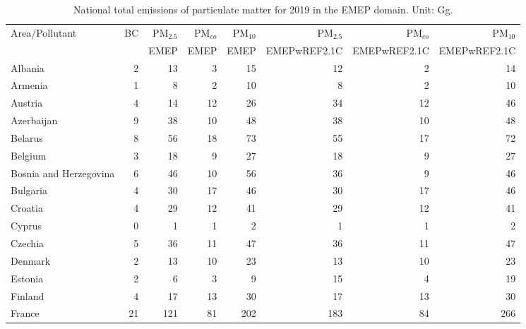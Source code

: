 \begin{table}
\caption{National total emissions of particulate matter for 2019 in the EMEP
  domain. Unit: Gg. }
\label{tab:2019emisPM}

\vspace{15pt}

\begin{center}
\scriptsize
\begin{tabular}{|l|r|r|r|r||r|r|r|}
\hline
 Area/Pollutant& BC&PM$_{2.5}$&PM$_{co}$&PM$_{10}$&PM$_{2.5}$&PM$_{co}$&PM$_{10}$\\
 &&EMEP&EMEP&EMEP&EMEPwREF2.1C&EMEPwREF2.1C&EMEPwREF2.1C\\\hline\hline
                       Albania&     2&    13&     3&    15&    12&     2&    14 \\\hline
                       Armenia&     1&     8&     2&    10&     8&     2&    10 \\\hline
                       Austria&     4&    14&    12&    26&    34&    12&    46 \\\hline
                    Azerbaijan&     9&    38&    10&    48&    38&    10&    48 \\\hline
                       Belarus&     8&    56&    18&    73&    55&    17&    72 \\\hline
                       Belgium&     3&    18&     9&    27&    18&     9&    27 \\\hline
        Bosnia and Herzegovina&     6&    46&    10&    56&    36&     9&    46 \\\hline
                      Bulgaria&     4&    30&    17&    46&    30&    17&    46 \\\hline
                       Croatia&     4&    29&    12&    41&    29&    12&    41 \\\hline
                        Cyprus&     0&     1&     1&     2&     1&     1&     2 \\\hline
                       Czechia&     5&    36&    11&    47&    36&    11&    47 \\\hline
                       Denmark&     2&    13&    10&    23&    13&    10&    23 \\\hline
                       Estonia&     2&     6&     3&     9&    15&     4&    19 \\\hline
                       Finland&     4&    17&    13&    30&    17&    13&    30 \\\hline
                        France&    21&   121&    81&   202&   183&    84&   266 \\\hline

\end{tabular}
\end{center}
\end{table}
